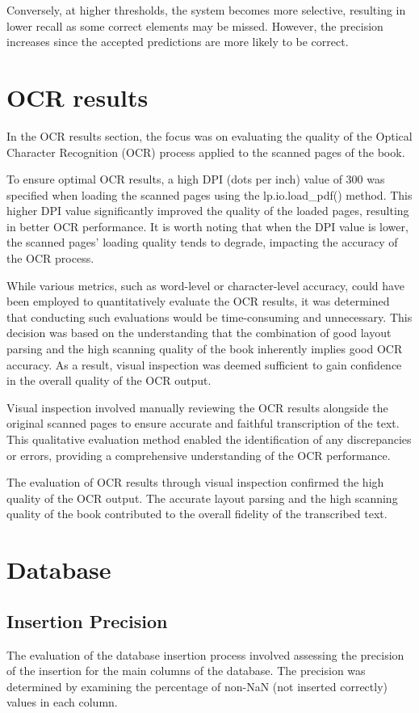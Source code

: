 Conversely, at higher thresholds, the system becomes more selective, resulting in lower recall as some correct elements may be missed. However, the precision increases since the accepted predictions are more likely to be correct.

\section{OCR results}
In the OCR results section, the focus was on evaluating the quality of the Optical Character Recognition (OCR) process applied to the scanned pages of the book. 

To ensure optimal OCR results, a high DPI (dots per inch) value of 300 was specified when loading the scanned pages using the lp.io.load\_pdf() method. This higher DPI value significantly improved the quality of the loaded pages, resulting in better OCR performance. It is worth noting that when the DPI value is lower, the scanned pages' loading quality tends to degrade, impacting the accuracy of the OCR process.

While various metrics, such as word-level or character-level accuracy, could have been employed to quantitatively evaluate the OCR results, it was determined that conducting such evaluations would be time-consuming and unnecessary. This decision was based on the understanding that the combination of good layout parsing and the high scanning quality of the book inherently implies good OCR accuracy. As a result, visual inspection was deemed sufficient to gain confidence in the overall quality of the OCR output.

Visual inspection involved manually reviewing the OCR results alongside the original scanned pages to ensure accurate and faithful transcription of the text. This qualitative evaluation method enabled the identification of any discrepancies or errors, providing a comprehensive understanding of the OCR performance. 

The evaluation of OCR results through visual inspection confirmed the high quality of the OCR output. The accurate layout parsing and the high scanning quality of the book contributed to the overall fidelity of the transcribed text.

\section{Database}
\subsection{Insertion Precision}
The evaluation of the database insertion process involved assessing the precision of the insertion for the main columns of the database. The precision was determined by examining the percentage of non-NaN (not inserted correctly) values in each column. 

